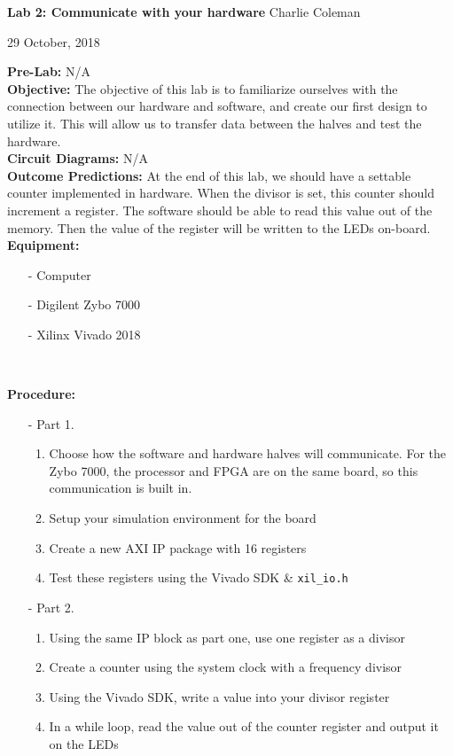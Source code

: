 \documentclass{article}
\begin{document}
\noindent \textbf{Lab 2: Communicate with your hardware} \hfill Charlie Coleman

\noindent \hfill 29 October, 2018

\noindent \textbf{Pre-Lab:} N/A\\

\noindent \textbf{Objective:} The objective of this lab is to familiarize ourselves with the connection between our hardware and software, and create our first design to utilize it. This will allow us to transfer data between the halves and test the hardware.\\

\noindent \textbf{Circuit Diagrams:} N/A\\

\noindent \textbf{Outcome Predictions:} At the end of this lab, we should have a settable counter implemented in hardware. When the divisor is set, this counter should increment a register. The software should be able to read this value out of the memory. Then the value of the register will be written to the LEDs on-board.\\

\noindent \textbf{Equipment:}

\begin{itemize}[nolistsep, noitemsep]
	\item[-] Computer
	\item[-] Digilent Zybo 7000
	\item[-] Xilinx Vivado 2018
\end{itemize}~

\noindent \textbf{Procedure:}

\begin{itemize}[noitemsep,nolistsep]
	\item[-] Part 1.
	\begin{enumerate}
		\item Choose how the software and hardware halves will communicate. For the Zybo 7000, the processor and FPGA are on the same board, so this communication is built in.
		\item Setup your simulation environment for the board
		\item Create a new AXI IP package with 16 registers
		\item Test these registers using the Vivado SDK \& \texttt{xil\_io.h}
	\end{enumerate}
	\item[-] Part 2.
	\begin{enumerate}
		\item Using the same IP block as part one, use one register as a divisor
		\item Create a counter using the system clock with a frequency divisor
		\item Using the Vivado SDK, write a value into your divisor register
		\item In a while loop, read the value out of the counter register and output it on the LEDs
	\end{enumerate}
\end{itemize}~
\end{document}
